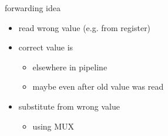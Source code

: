 \begin{frame}{forwarding idea}
    \begin{itemize}
    \item read wrong value (e.g. from register)
    \item correct value is 
        \begin{itemize}
        \item elsewhere in pipeline
        \item maybe even after old value was read
        \end{itemize}
    \item substitute from wrong value
        \begin{itemize}
        \item using MUX
        \end{itemize}
    \end{itemize}
\end{frame}
